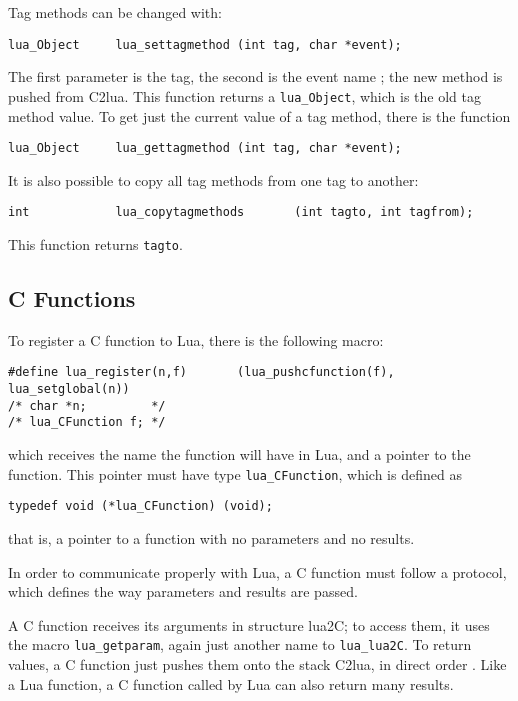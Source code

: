 Tag methods can be changed with:
\begin{verbatim}
lua_Object     lua_settagmethod (int tag, char *event);
\end{verbatim}
The first parameter is the tag,
the second is the event name ;
the new method is pushed from C2lua.
This function returns a \verb|lua_Object|,
which is the old tag method value.
To get just the current value of a tag method,
there is the function
\begin{verbatim}
lua_Object     lua_gettagmethod (int tag, char *event);
\end{verbatim}

It is also possible to copy all tag methods from one tag to another:
\begin{verbatim}
int            lua_copytagmethods       (int tagto, int tagfrom);
\end{verbatim}
This function returns \verb|tagto|.


\subsection{C Functions} \label{LuacallC}
To register a C function to Lua,
there is the following macro:
\begin{verbatim}
#define lua_register(n,f)       (lua_pushcfunction(f), lua_setglobal(n))
/* char *n;         */
/* lua_CFunction f; */
\end{verbatim}
which receives the name the function will have in Lua,
and a pointer to the function.
This pointer must have type \verb|lua_CFunction|,
which is defined as
\begin{verbatim}
typedef void (*lua_CFunction) (void);
\end{verbatim}
that is, a pointer to a function with no parameters and no results.

In order to communicate properly with Lua,
a C function must follow a protocol,
which defines the way parameters and results are passed.

A C function receives its arguments in structure lua2C;
to access them, it uses the macro \verb|lua_getparam|, 
again just another name to \verb|lua_lua2C|.
To return values, a C function just pushes them onto the stack C2lua,
in direct order .
Like a Lua function, a C function called by Lua can also return
many results.

